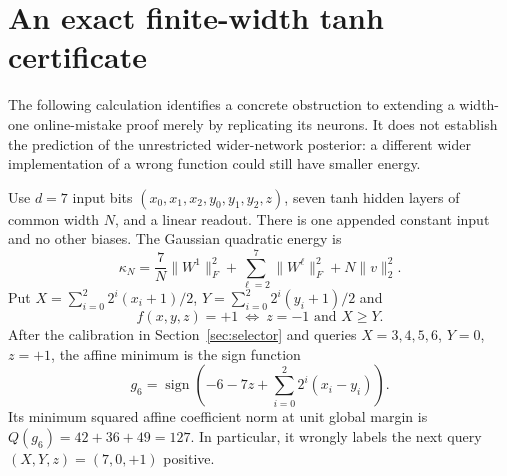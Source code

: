 \section{An exact finite-width tanh certificate}
\label{sec:finite}

The following calculation identifies a concrete obstruction to extending a
width-one online-mistake proof merely by replicating its neurons. It does
not establish the prediction of the unrestricted wider-network posterior:
a different wider implementation of a wrong function could still have
smaller energy.

Use $d=7$ input bits $(x_0,x_1,x_2,y_0,y_1,y_2,z)$, seven tanh hidden
layers of common width $N$, and a linear readout. There is one appended
constant input and no other biases. The Gaussian quadratic energy is
\[
 \kappa_N=\frac7N\|W^1\|_F^2+
       \sum_{\ell=2}^{7}\|W^\ell\|_F^2+N\|v\|_2^2.
\]
Put $X=\sum_{i=0}^2 2^i(x_i+1)/2$, $Y=\sum_{i=0}^2 2^i(y_i+1)/2$ and
\[
 f(x,y,z)=+1\ \Longleftrightarrow\ z=-1\text{ and }X\ge Y.
\]
After the calibration in Section~\ref{sec:selector} and queries
$X=3,4,5,6$, $Y=0$, $z=+1$, the affine minimum is the sign function
\[
 g_6=\operatorname{sign}\!\left(-6-7z+
                       \sum_{i=0}^2 2^i(x_i-y_i)\right).
\]
Its minimum squared affine coefficient norm at unit global margin is
$Q(g_6)=42+36+49=127$. In particular, it wrongly labels the next query
$(X,Y,z)=(7,0,+1)$ positive.

